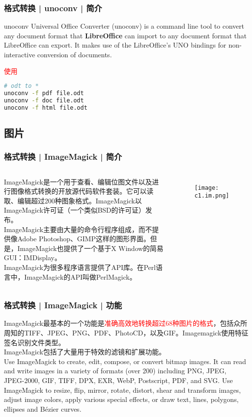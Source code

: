 \begin{frame}[fragile]
  \frametitle{格式转换 | unoconv | 简介}
  \begin{block}{unoconv}
    Universal Office Converter (unoconv) is a command line tool to convert any document format that \textbf{LibreOffice} can import to any document format that LibreOffice can export. It makes use of the LibreOffice’s UNO bindings for non-interactive conversion of documents.
  \end{block}
  \begin{block}{\textcolor{red}{使用}}
\begin{lstlisting}[language=bash]
# odt to *
unoconv -f pdf file.odt
unoconv -f doc file.odt
unoconv -f html file.odt
\end{lstlisting}
  \end{block}
\end{frame}

\subsection{图片}
\begin{frame}
  \frametitle{格式转换 | ImageMagick | 简介}
  \begin{columns}
ImageMagick是一个用于查看、编辑位图文件以及进行图像格式转换的开放源代码软件套装。它可以读取、编辑超过200种图象格式。ImageMagick以ImageMagick许可证（一个类似BSD的许可证）发布。\\
\vspace{1em}
ImageMagick主要由大量的命令行程序组成，而不提供像Adobe Photoshop、GIMP这样的图形界面。但是，ImageMagick也提供了一个基于X Window的简易GUI：IMDisplay。\\
\vspace{1em}
ImageMagick为很多程序语言提供了API库。在Perl语言中，ImageMagick的API叫做PerlMagick。\\
  \begin{figure}
    \centering
    \texttt{[image: c1.im.png]}
  \end{figure}
\end{columns}
\end{frame}

\begin{frame}
  \frametitle{格式转换 | ImageMagick | 功能}
ImageMagick最基本的一个功能是\textcolor{red}{准确高效地转换超过68种图片的格式}，包括众所周知的TIFF、JPEG、PNG、PDF、PhotoCD，以及GIF。Imagemagick使用特征签名识别文件类型。\\
\vspace{1em}
ImageMagick包括了大量用于特效的滤镜和扩展功能。\\
\vspace{1em}
Use ImageMagick to create, edit, compose, or convert bitmap images. It can read and write images in a variety of formats (over 200) including PNG, JPEG, JPEG-2000, GIF, TIFF, DPX, EXR, WebP, Postscript, PDF, and SVG. Use ImageMagick to resize, flip, mirror, rotate, distort, shear and transform images, adjust image colors, apply various special effects, or draw text, lines, polygons, ellipses and Bézier curves.
\end{frame}


